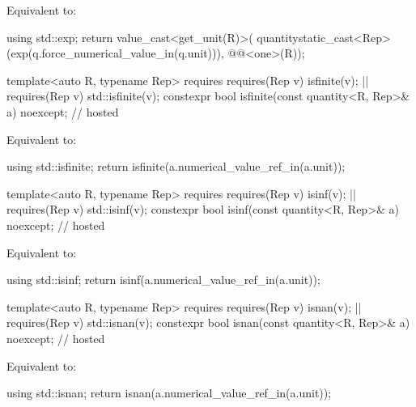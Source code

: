 \begin{itemdescr}
\pnum
\effects
Equivalent to:
\begin{codeblock}
using std::exp;
return value_cast<get_unit(R)>(
  quantity{static_cast<Rep>(exp(q.force_numerical_value_in(q.unit))),
           @@<one>(R)});
\end{codeblock}
\end{itemdescr}

\begin{itemdecl}
template<auto R, typename Rep>
  requires requires(Rep v) { isfinite(v); } || requires(Rep v) { std::isfinite(v); }
constexpr bool isfinite(const quantity<R, Rep>& a) noexcept;                            // hosted
\end{itemdecl}

\begin{itemdescr}
\pnum
\effects
Equivalent to:
\begin{codeblock}
using std::isfinite;
return isfinite(a.numerical_value_ref_in(a.unit));
\end{codeblock}
\end{itemdescr}

\begin{itemdecl}
template<auto R, typename Rep>
  requires requires(Rep v) { isinf(v); } || requires(Rep v) { std::isinf(v); }
constexpr bool isinf(const quantity<R, Rep>& a) noexcept;                               // hosted
\end{itemdecl}

\begin{itemdescr}
\pnum
\effects
Equivalent to:
\begin{codeblock}
using std::isinf;
return isinf(a.numerical_value_ref_in(a.unit));
\end{codeblock}
\end{itemdescr}

\begin{itemdecl}
template<auto R, typename Rep>
  requires requires(Rep v) { isnan(v); } || requires(Rep v) { std::isnan(v); }
constexpr bool isnan(const quantity<R, Rep>& a) noexcept;                               // hosted
\end{itemdecl}

\begin{itemdescr}
\pnum
\effects
Equivalent to:
\begin{codeblock}
using std::isnan;
return isnan(a.numerical_value_ref_in(a.unit));
\end{codeblock}
\end{itemdescr}

